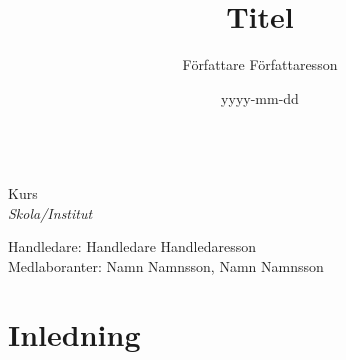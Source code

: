 \documentclass[a4paper]{article}
\title{Titel}
\author{Författare Författaresson}
\date{yyyy-mm-dd} %
\begin{document}
\begin{header}
    {\LARGE\textbf{\@title}}

    \vspace{1em}
    \@author\\
    Kurs\\
    \textit{Skola/Institut}
    
    \vspace{1em}
    Handledare: Handledare Handledaresson\\
    Medlaboranter: Namn Namnsson, Namn Namnsson
    
    \vspace{1em}
    \@date
    
\end{header}

\tableofcontents

\section{Inledning}

\end{document}
